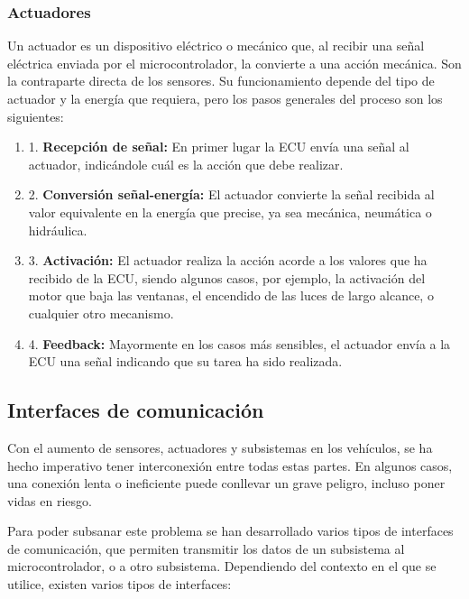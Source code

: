 \subsubsection{Actuadores}

Un actuador es un dispositivo eléctrico o mecánico que, al recibir una señal eléctrica enviada por el microcontrolador, la convierte a una acción mecánica. Son la contraparte directa de los sensores. Su funcionamiento depende del tipo de actuador y la energía que requiera, pero los pasos generales del proceso son los siguientes:

\begin{enumerate}
    \item 1. \textbf{Recepción de señal:} En primer lugar la ECU envía una señal al actuador, indicándole cuál es la acción que debe realizar. 
    \item 2. \textbf{Conversión señal-energía:} El actuador convierte la señal recibida al valor equivalente en la energía que precise, ya sea mecánica, neumática o hidráulica. 
    \item 3. \textbf{Activación:} El actuador realiza la acción acorde a los valores que ha recibido de la ECU, siendo algunos casos, por ejemplo, la activación del motor que baja las ventanas, el encendido de las luces de largo alcance, o cualquier otro mecanismo. 
    \item 4. \textbf{Feedback:} Mayormente en los casos más sensibles, el actuador envía a la ECU una señal indicando que su tarea ha sido realizada.
\end{enumerate}

\subsection{Interfaces de comunicación}
Con el aumento de sensores, actuadores y subsistemas en los vehículos, se ha hecho imperativo tener interconexión entre todas estas partes. En algunos casos, una conexión lenta o ineficiente puede conllevar un grave peligro, incluso poner vidas en riesgo. 

Para poder subsanar este problema se han desarrollado varios tipos de interfaces de comunicación, que permiten transmitir los datos de un subsistema al microcontrolador, o a otro subsistema. Dependiendo del contexto en el que se utilice, existen varios tipos de interfaces:

